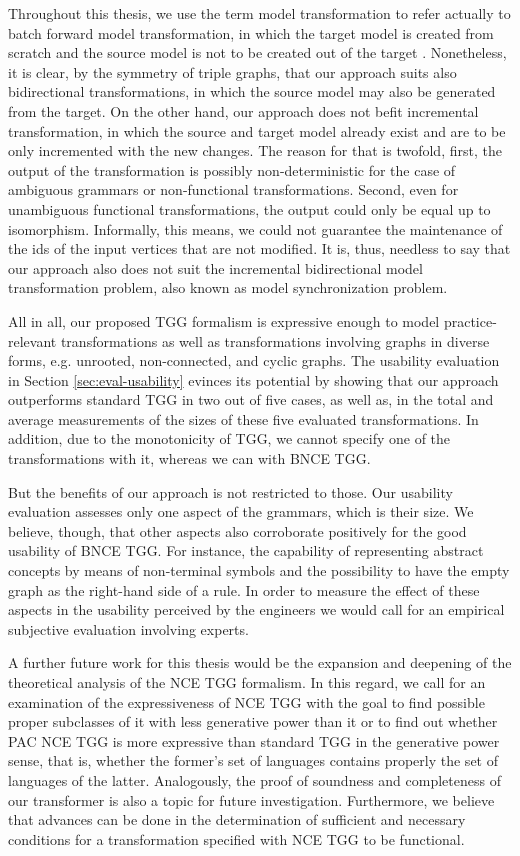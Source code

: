 Throughout this thesis, we use the term model transformation to refer actually to batch forward model transformation, in which the target model is created from scratch and the source model is not to be created out of the target \cite{mens2006taxonomy}. Nonetheless, it is clear, by the symmetry of triple graphs, that our approach suits also bidirectional transformations, in which the source model may also be generated from the target. On the other hand, our approach does not befit incremental transformation, in which the source and target model already exist and are to be only incremented with the new changes. The reason for that is twofold, first, the output of the transformation is possibly non-deterministic for the case of ambiguous grammars or non-functional transformations. Second, even for unambiguous functional transformations, the output could only be equal up to isomorphism. Informally, this means, we could not guarantee the maintenance of the ids of the input vertices that are not modified. It is, thus, needless to say that our approach also does not suit the incremental bidirectional model transformation problem, also known as model synchronization problem.

All in all, our proposed TGG formalism is expressive enough to model practice-relevant transformations as well as transformations involving graphs in diverse forms, e.g. unrooted, non-connected, and cyclic graphs. The usability evaluation in Section \ref{sec:eval-usability} evinces its potential by showing that our approach outperforms standard TGG in two out of five cases, as well as, in the total and average measurements of the sizes of these five evaluated transformations. In addition, due to the monotonicity of TGG, we cannot specify one of the transformations with it, whereas we can with BNCE TGG.

But the benefits of our approach is not restricted to those. Our usability evaluation assesses only one aspect of the grammars, which is their size. We believe, though, that other aspects also corroborate positively for the good usability of BNCE TGG. For instance, the capability of representing abstract concepts by means of non-terminal symbols and the possibility to have the empty graph as the right-hand side of a rule. In order to measure the effect of these aspects in the usability perceived by the engineers we would call for an empirical subjective evaluation involving experts.

A further future work for this thesis would be the expansion and deepening of the theoretical analysis of the NCE TGG formalism. In this regard, we call for an examination of the expressiveness of NCE TGG with the goal to find possible proper subclasses of it with less generative power than it or to find out whether PAC NCE TGG is more expressive than standard TGG in the generative power sense, that is, whether the former's set of languages contains properly the set of languages of the latter. Analogously, the proof of soundness and completeness of our transformer is also a topic for future investigation. Furthermore, we believe that advances can be done in the determination of sufficient and necessary conditions for a transformation specified with NCE TGG to be functional.


